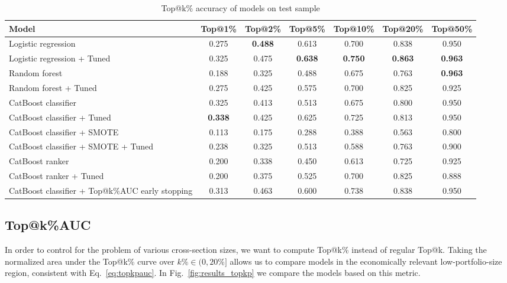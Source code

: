 \documentclass{ieeeaccess}
\begin{document}
\begin{table}[!t]
    \centering
    \setlength{\tabcolsep}{6pt}
    \renewcommand{\arraystretch}{1.2}
    \caption{Top@k\% accuracy of models on test sample}
    \begin{tabular}{lcccccc}
        \toprule
        Model & Top@1\% & Top@2\% & Top@5\% & Top@10\% & Top@20\% & Top@50\% \\
        \midrule
        Logistic regression & 0.275 & \textbf{0.488} & 0.613 & 0.700 & 0.838 & 0.950 \\
        Logistic regression + Tuned & 0.325 & 0.475 & \textbf{0.638} & \textbf{0.750} & \textbf{0.863} & \textbf{0.963} \\
        Random forest & 0.188 & 0.325 & 0.488 & 0.675 & 0.763 & \textbf{0.963} \\
        Random forest + Tuned & 0.275 & 0.425 & 0.575 & 0.700 & 0.825 & 0.925 \\
        CatBoost classifier & 0.325 & 0.413 & 0.513 & 0.675 & 0.800 & 0.950 \\
        CatBoost classifier + Tuned & \textbf{0.338} & 0.425 & 0.625 & 0.725 & 0.813 & 0.950 \\
        CatBoost classifier + SMOTE & 0.113 & 0.175 & 0.288 & 0.388 & 0.563 & 0.800 \\
        CatBoost classifier + SMOTE + Tuned & 0.238 & 0.325 & 0.513 & 0.588 & 0.763 & 0.900 \\
        CatBoost ranker & 0.200 & 0.338 & 0.450 & 0.613 & 0.725 & 0.925 \\
        CatBoost ranker + Tuned & 0.200 & 0.375 & 0.525 & 0.700 & 0.825 & 0.888 \\
        CatBoost classifier + Top@k\%AUC early stopping & 0.313 & 0.463 & 0.600 & 0.738 & 0.838 & 0.950 \\
        \bottomrule
    \end{tabular}
    \label{table:results_topkp}
\end{table}


\subsection{Top@k\%AUC}



In order to control for the problem of various cross-section sizes, we  want to compute Top@k\% instead of regular Top@k. Taking the normalized area under the Top@k\% curve over $k\% \in (0, 20\%]$ allows us to compare models in the economically relevant low-portfolio-size region, consistent with Eq.~\ref{eq:topkpauc}. In Fig.~\ref{fig:results_topkp} we compare the models based on this metric.
\end{document}
